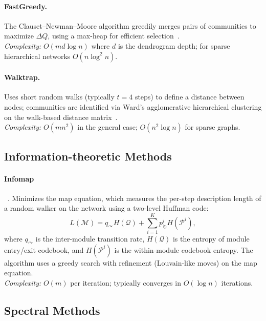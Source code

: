 \documentclass[11pt]{article}
\begin{document}
\paragraph{FastGreedy.}
The Clauset--Newman--Moore algorithm greedily merges pairs of communities to maximize $\Delta Q$, using a max-heap for efficient selection~\citep{m__e__j__newman_cfc12888}.\\
\emph{Complexity:} $O(md\log n)$ where $d$ is the dendrogram depth; for sparse hierarchical networks $O(n\log^2 n)$.

\paragraph{Walktrap.}
Uses short random walks (typically $t=4$ steps) to define a distance between nodes; communities are identified via Ward's agglomerative hierarchical clustering on the walk-based distance matrix~\citep{santo_fortunato_93a74814}.\\
\emph{Complexity:} $O(mn^2)$ in the general case; $O(n^2\log n)$ for sparse graphs.

\subsection{Information-theoretic Methods}

\paragraph{Infomap}~\citep{martin_rosvall_68b9da5e}.
Minimizes the map equation, which measures the per-step description length of a random walker on the network using a two-level Huffman code:
\[
L(\mathcal{M}) = q_\curvearrowright H(\mathcal{Q}) + \sum_{i=1}^K p_{\circlearrowright}^i H(\mathcal{P}^i),
\]
where $q_\curvearrowright$ is the inter-module transition rate, $H(\mathcal{Q})$ is the entropy of module entry/exit codebook, and $H(\mathcal{P}^i)$ is the within-module codebook entropy. The algorithm uses a greedy search with refinement (Louvain-like moves) on the map equation.\\
\emph{Complexity:} $O(m)$ per iteration; typically converges in $O(\log n)$ iterations.

\subsection{Spectral Methods}
\end{document}
